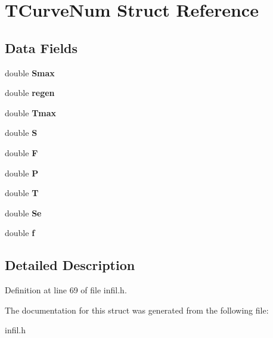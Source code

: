 \hypertarget{struct_t_curve_num}{}\section{T\+Curve\+Num Struct Reference}
\label{struct_t_curve_num}
\subsection*{Data Fields}
\begin{DoxyCompactItemize}
\item 
\mbox{\label{struct_t_curve_num_a9706974419a9996f5f21000ede3cd3fd}} 
double {\bfseries Smax}
\item 
\mbox{\label{struct_t_curve_num_ad827b247bd930ce94ec7495415c7943c}} 
double {\bfseries regen}
\item 
\mbox{\label{struct_t_curve_num_a018163171a5470122e414796af4fe166}} 
double {\bfseries Tmax}
\item 
\mbox{\label{struct_t_curve_num_a1f3afedeffb9d5e23fe337fc32161bc0}} 
double {\bfseries S}
\item 
\mbox{\label{struct_t_curve_num_ae3520ebb3ff8d6feab3e6afb47ed4040}} 
double {\bfseries F}
\item 
\mbox{\label{struct_t_curve_num_a8019aa9167c19c810aefa4cd5c0b0ab5}} 
double {\bfseries P}
\item 
\mbox{\label{struct_t_curve_num_ac94a6e5794c2d7b59588b14025cfba20}} 
double {\bfseries T}
\item 
\mbox{\label{struct_t_curve_num_ac8b3f61f840d4a472222552eb8721243}} 
double {\bfseries Se}
\item 
\mbox{\label{struct_t_curve_num_a2e13cbaaba1951fdfe9e83d8b031e802}} 
double {\bfseries f}
\end{DoxyCompactItemize}


\subsection{Detailed Description}


Definition at line 69 of file infil.\+h.



The documentation for this struct was generated from the following file\+:\begin{DoxyCompactItemize}
\item 
infil.\+h\end{DoxyCompactItemize}
